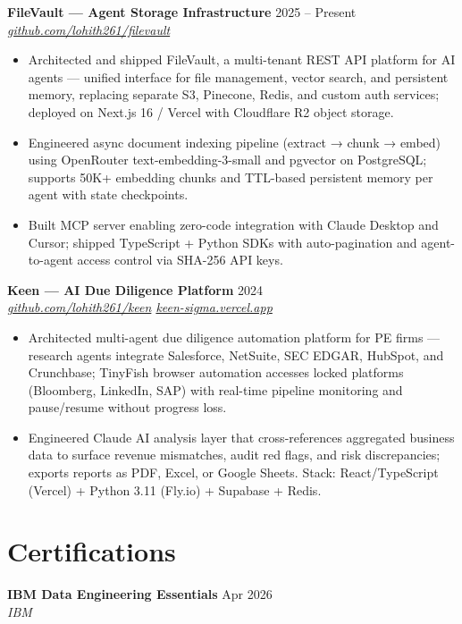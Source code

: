 \documentclass[10pt,letterpaper]{article}
\newcommand{\entry}[3]{%
  \vspace{3pt}\textbf{#1} \hfill #3 \\
  \textit{\small #2}\vspace{1pt}}
\begin{document}
\entry{FileVault --- Agent Storage Infrastructure}{\href{https://github.com/lohith261/filevault}{github.com/lohith261/filevault}}{2025 -- Present}
\begin{itemize}
  \item Architected and shipped FileVault, a multi-tenant REST API platform for AI agents --- unified interface for file management, vector search, and persistent memory, replacing separate S3, Pinecone, Redis, and custom auth services; deployed on Next.js 16 / Vercel with Cloudflare R2 object storage.
  \item Engineered async document indexing pipeline (extract → chunk → embed) using OpenRouter text-embedding-3-small and pgvector on PostgreSQL; supports 50K+ embedding chunks and TTL-based persistent memory per agent with state checkpoints.
  \item Built MCP server enabling zero-code integration with Claude Desktop and Cursor; shipped TypeScript + Python SDKs with auto-pagination and agent-to-agent access control via SHA-256 API keys.
\end{itemize}

\entry{Keen --- AI Due Diligence Platform}{\href{https://github.com/lohith261/keen}{github.com/lohith261/keen} \quad\textbullet\quad \href{https://keen-sigma.vercel.app/}{keen-sigma.vercel.app}}{2024}
\begin{itemize}
  \item Architected multi-agent due diligence automation platform for PE firms --- research agents integrate Salesforce, NetSuite, SEC EDGAR, HubSpot, and Crunchbase; TinyFish browser automation accesses locked platforms (Bloomberg, LinkedIn, SAP) with real-time pipeline monitoring and pause/resume without progress loss.
  \item Engineered Claude AI analysis layer that cross-references aggregated business data to surface revenue mismatches, audit red flags, and risk discrepancies; exports reports as PDF, Excel, or Google Sheets. Stack: React/TypeScript (Vercel) + Python 3.11 (Fly.io) + Supabase + Redis.
\end{itemize}

\section{Certifications}

\textbf{IBM Data Engineering Essentials} \hfill Apr 2026 \\
\textit{IBM}
\end{document}
